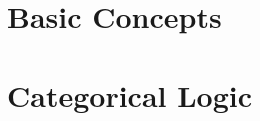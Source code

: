 \documentclass[twoside, openright]{book}
\begin{document}

\raggedright
\setlength{\parindent}{1em}
\setlength{\parskip}{1em}	

\frontmatter
\pagestyle{plain} %

	


{
\setlength{\parskip}{0em}

\renewcommand{\cftpartpresnum}{\sf\Large\partname\ }
\tableofcontents
}

	




\mainmatter
\setlength{\parindent}{1em}
\pagestyle{headings} %
\label{full_version} %

%
\part{Basic Concepts} \label{part:basic_concepts}
%	
%
%
%
\part{Categorical Logic}\label{part:cat_logic}
%
%
	
%
%
%
%
%
%
%
%
%
%
%
%
%
%
%
%
\end{document}
